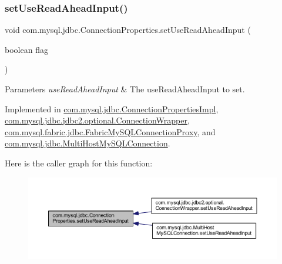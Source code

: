 \subsubsection{\texorpdfstring{set\+Use\+Read\+Ahead\+Input()}{setUseReadAheadInput()}}
{\footnotesize\ttfamily void com.\+mysql.\+jdbc.\+Connection\+Properties.\+set\+Use\+Read\+Ahead\+Input (\begin{DoxyParamCaption}\item[{boolean}]{flag }\end{DoxyParamCaption})}


\begin{DoxyParams}{Parameters}
{\em use\+Read\+Ahead\+Input} & The use\+Read\+Ahead\+Input to set. \\
\hline
\end{DoxyParams}


Implemented in \mbox{\hyperlink{classcom_1_1mysql_1_1jdbc_1_1_connection_properties_impl_a8abdec8506338f240bf554813798915d}{com.\+mysql.\+jdbc.\+Connection\+Properties\+Impl}}, \mbox{\hyperlink{classcom_1_1mysql_1_1jdbc_1_1jdbc2_1_1optional_1_1_connection_wrapper_ae880ea3eac682792cff918e06fddbb3b}{com.\+mysql.\+jdbc.\+jdbc2.\+optional.\+Connection\+Wrapper}}, \mbox{\hyperlink{classcom_1_1mysql_1_1fabric_1_1jdbc_1_1_fabric_my_s_q_l_connection_proxy_ab44cea5c0fd2504ca0c54f21019d6438}{com.\+mysql.\+fabric.\+jdbc.\+Fabric\+My\+S\+Q\+L\+Connection\+Proxy}}, and \mbox{\hyperlink{classcom_1_1mysql_1_1jdbc_1_1_multi_host_my_s_q_l_connection_a21f5fe21bfa20f67e36444ccc130fa4a}{com.\+mysql.\+jdbc.\+Multi\+Host\+My\+S\+Q\+L\+Connection}}.

Here is the caller graph for this function\+:\nopagebreak
\begin{figure}[H]
\begin{center}
\leavevmode
\includegraphics[width=350pt]{interfacecom_1_1mysql_1_1jdbc_1_1_connection_properties_a4c83918a441a7c5938d0ec80a975b92b_icgraph}
\end{center}
\end{figure}
\mbox{\label{interfacecom_1_1mysql_1_1jdbc_1_1_connection_properties_ace9e4d9927b8eb7afd57054f4adf6316}} 
